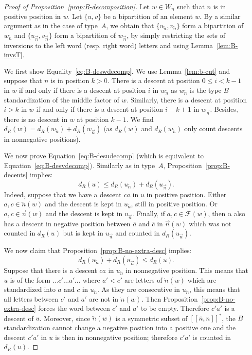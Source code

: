 \documentclass[ALCO,Unicode]{cedram}
\theoremstyle{definition}
\newcommand{\R}{{\overrightarrow{n}}}
\newcommand{\LL}{{\overleftarrow{n}}}
\newcommand{\dd}{d_R}
\newcommand{\Bsetnn}{[\![\bar{n},n ]\!]^*}
\newcommand{\F}{\mathcal{F}}
\begin{document}
\begin{proof}[Proof of Proposition~\ref{prop:B-decomposition}]
Let $w\in W_n$ such that $n$ is in positive position in $w$. Let $\lbrace u, v \rbrace$ be a bipartition of an element $w$. By a similar argument as in the case of type~$A$, we obtain that $\lbrace u_\LL, v_\LL \rbrace$ form a bipartition of $w_\LL$ and $\lbrace u_\R, v_\R \rbrace$ form a bipartition of $w_\R$, by simply restricting the sets of inversions to the left word (resp. right word) letters and using Lemma~\ref{lem:B-invsT}.

We first show Equality~\eqref{eq:B-deswdecomp}. We use Lemma~\ref{lem:b-cut} and suppose that $n$ is in position $k > 0$. There is a descent at position $ 0 \leq i < k - 1$ in $w$ if and only if there is a descent at position $i$ in $w_\LL$ as $w_\LL$ is the type $B$ standardization of the middle factor of $w$. Similarly, there is a descent at position $i > k$ in $w$ if and only if there is a descent at position $i-k+1$ in $w_\R$. Besides, there is no descent in $w$ at position $k-1$. We find $\dd(w) = \dd(w_\LL) + \dd(w_\R)$ (as $\dd(w)$ and $\dd(w_\LL)$ only count descents in nonnegative positions).

We now prove Equation~\eqref{eq:B-desudecomp} (which is equivalent to Equation~\eqref{eq:B-desvdecomp}). Similarly as in type~$A$, Proposition~\ref{prop:B-decents} implies:
\begin{equation*}
\dd(u) \leq \dd(u_\LL) + \dd(u_\R).
\end{equation*} 
Indeed, suppose that we have a descent $ca$ in $u$ in positive position. Either $a,c \in \LL(w)$ and the descent is kept in $u_\LL$, still in positive position. Or $a,c \in \R(w)$ and the descent is kept in $u_\R$. Finally, if $a,c \in \F(w)$, then $u$ also has a descent in negative position between $\bar a$ and $\bar c$ in $\R(w)$ which was not counted in $\dd(u)$ but is kept in $u_\R$ and counted in $\dd(u_\R)$. 

We now claim that Proposition~\ref{prop:B-no-extra-desc} implies:
\begin{equation*}
\dd(u_\LL) + \dd(u_\R) \leq \dd(u).
\end{equation*} 
Suppose that there is a descent $ca$ in $u_\LL$ in nonnegative position. This means that $u$ is of the form $\dots c' \dots a' \dots$ where $a' < c'$ are letters of $\LL(w)$ which are standardized into $a$ and $c$ in $u_\LL$. As they are consecutive in $u_\LL$, this means that all letters between $c'$ and $a'$ are not in $\LL(w)$. Then Proposition~\ref{prop:B-no-extra-desc} forces the word between $c'$ and $a'$ to be empty. Therefore $c'a'$ is a descent of $u$. 
Moreover, since $\LL(w)$ is a symmetric subset of $\Bsetnn$, the $B$ standardization cannot change a negative position into a positive one and the descent $c'a'$ in $u$ is then in nonnegative position; therefore $c'a'$ is counted in $\dd(u)$. 


\end{proof}
\end{document}
